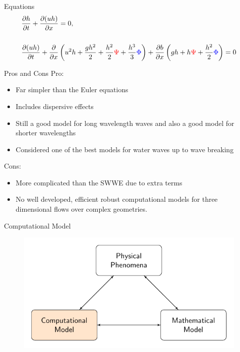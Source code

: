 \documentclass[pdf]{beamer}
\begin{document}
\begin{frame}{Equations}
	\begin{subequations}
		\begin{align*}
		&\frac{\partial h}{\partial t} + \dfrac{\partial (uh)}{\partial x} = 0,  \\ \\
		&\dfrac{\partial (uh)}{\partial t} + \dfrac{\partial}{\partial x} \left ( u^2h + \dfrac{gh^2}{2} + \dfrac{h^2}{2}{ \color{red}\Psi } + \dfrac{h^3}{3}{ { \color{blue} \Phi } }  \right )  +  \dfrac{\partial b}{\partial x} \left (gh +   h { \color{red}\Psi } + \dfrac{h^2}{2}{ { \color{blue} \Phi } }  \right ) = 0
		\end{align*}
	\end{subequations}
\end{frame}
\begin{frame}{Pros and Cons}
	Pro:
	\begin{itemize}
		\item Far simpler than the Euler equations
		\item Includes dispersive effects
		\item Still a good model for long wavelength waves and also a good model for shorter wavelengths
		\item Considered one of the best models for water waves up to wave breaking
	\end{itemize}
	Cons:
	\begin{itemize}
		\item More complicated than the SWWE due to extra terms
		\item No well developed, efficient robust computational models for three dimensional flows over complex geometries. 
	\end{itemize}
\end{frame}
\begin{frame}{Computational Model}
	\begin{figure}
		\includegraphics[width=\textwidth]{./Pics/ModelDiagrams/FlowChartHigh3O.pdf}
	\end{figure}
\end{frame}
\end{document}
